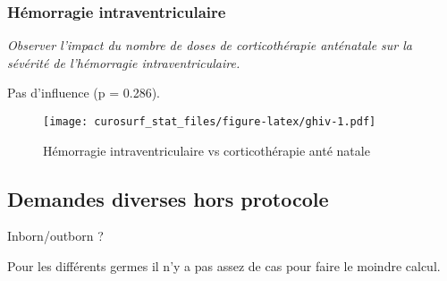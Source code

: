 \documentclass[
  10pt,
  a4paper,
]{scrartcl}
\begin{document}
\hypertarget{huxe9morragie-intraventriculaire}{%
\subsubsection{Hémorragie
intraventriculaire}\label{huxe9morragie-intraventriculaire}}

\emph{Observer l'impact du nombre de doses de corticothérapie anténatale
sur la sévérité de l'hémorragie intraventriculaire.}

Pas d'influence (p = 0.286).

\begin{figure}
\centering
\texttt{[image: curosurf\_stat\_files/figure-latex/ghiv-1.pdf]}
\caption{Hémorragie intraventriculaire vs corticothérapie anté natale}
\end{figure}

\hypertarget{demandes-diverses-hors-protocole}{%
\subsection{Demandes diverses hors
protocole}\label{demandes-diverses-hors-protocole}}

Inborn/outborn ?

Pour les différents germes il n'y a pas assez de cas pour faire le
moindre calcul.
\end{document}
